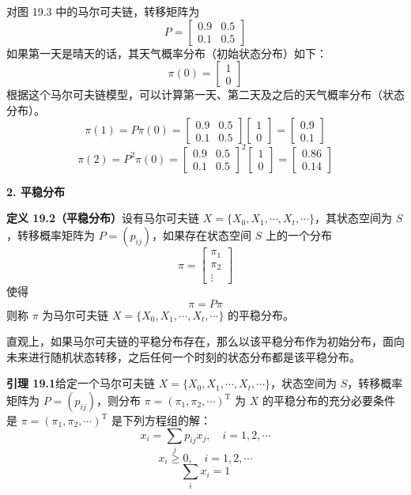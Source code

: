 \documentclass[UTF8, 12pt, fontset=fandol, oneside]{ctexart}
\begin{document}
对图 19.3 中的马尔可夫链，转移矩阵为
\[
P=
\begin{bmatrix}
0.9 & 0.5\\
0.1 & 0.5
\end{bmatrix}
\]
如果第一天是晴天的话，其天气概率分布（初始状态分布）如下：
\[
\pi(0)=
\begin{bmatrix}
1\\
0
\end{bmatrix}
\]
根据这个马尔可夫链模型，可以计算第一天、第二天及之后的天气概率分布（状态分布）。
\[
\pi(1)=P\pi(0)=
\begin{bmatrix}
0.9 & 0.5\\
0.1 & 0.5
\end{bmatrix}
\begin{bmatrix}
1\\
0
\end{bmatrix}
=
\begin{bmatrix}
0.9\\
0.1
\end{bmatrix}
\]
\[
\pi(2)=P^2\pi(0)=
\begin{bmatrix}
0.9 & 0.5\\
0.1 & 0.5
\end{bmatrix}^2
\begin{bmatrix}
1\\
0
\end{bmatrix}
=
\begin{bmatrix}
0.86\\
0.14
\end{bmatrix}
\]

\noindent\textbf{2. 平稳分布}

\noindent\textbf{定义 19.2（平稳分布）}\quad 设有马尔可夫链 $X=\{X_0,X_1,\cdots,X_t,\cdots\}$，其状态空间为 $S$，转移概率矩阵为 $P=(p_{ij})$，如果存在状态空间 $S$ 上的一个分布
\[
\pi=
\begin{bmatrix}
\pi_1\\
\pi_2\\
\vdots
\end{bmatrix}
\]
使得
\begin{equation}
\pi=P\pi
\tag{19.15}
\end{equation}
则称 $\pi$ 为马尔可夫链 $X=\{X_0,X_1,\cdots,X_t,\cdots\}$ 的平稳分布。

直观上，如果马尔可夫链的平稳分布存在，那么以该平稳分布作为初始分布，面向未来进行随机状态转移，之后任何一个时刻的状态分布都是该平稳分布。

\noindent\textbf{引理 19.1}\quad 给定一个马尔可夫链 $X=\{X_0,X_1,\cdots,X_t,\cdots\}$，状态空间为 $S$，转移概率矩阵为 $P=(p_{ij})$，则分布 $\pi=(\pi_1,\pi_2,\cdots)^{\mathrm{T}}$ 为 $X$ 的平稳分布的充分必要条件是 $\pi=(\pi_1,\pi_2,\cdots)^{\mathrm{T}}$ 是下列方程组的解：
\begin{equation}
x_i=\sum_j p_{ij}x_j,\quad i=1,2,\cdots
\tag{19.16}
\end{equation}
\begin{equation}
x_i\geqslant 0,\quad i=1,2,\cdots
\tag{19.17}
\end{equation}
\begin{equation}
\sum_i x_i=1
\tag{19.18}
\end{equation}
\end{document}
